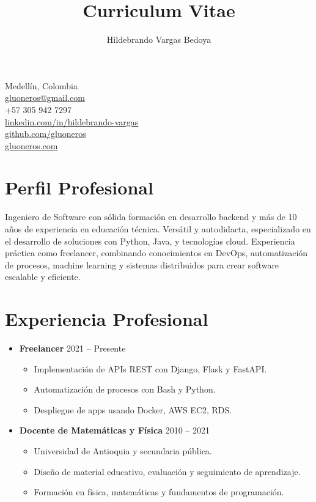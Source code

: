 \documentclass[a4paper,10pt]{article}
\begin{document}
	
	\title{\textbf{Curriculum Vitae}}
	\author{Hildebrando Vargas Bedoya}
	\date{}
	\maketitle
	
	\begin{center}
		Medellín, Colombia \\
		\href{mailto:gluoneros@gmail.com}{gluoneros@gmail.com} \\
		+57 305 942 7297 \\
		\href{https://linkedin.com/in/hildebrando-vargas}{linkedin.com/in/hildebrando-vargas} \\
		\href{https://github.com/gluoneros}{github.com/gluoneros} \\
		\href{https://gluoneros.com}{gluoneros.com}
	\end{center}
	
	\section*{Perfil Profesional}
	Ingeniero de Software con sólida formación en desarrollo backend y más de 10 años de experiencia en educación técnica. Versátil y autodidacta, especializado en el desarrollo de soluciones con Python, Java, y tecnologías cloud. Experiencia práctica como freelancer, combinando conocimientos en DevOps, automatización de procesos, machine learning y sistemas distribuidos para crear software escalable y eficiente.
	
	\section*{Experiencia Profesional}
	\begin{itemize}[leftmargin=*]
		\item \textbf{Freelancer} \hfill 2021 – Presente
		\begin{itemize}
			\item Implementación de APIs REST con Django, Flask y FastAPI.
			\item Automatización de procesos con Bash y Python.
			\item Despliegue de apps usando Docker, AWS EC2, RDS.
		\end{itemize}
		\item \textbf{Docente de Matemáticas y Física} \hfill 2010 – 2021
		\begin{itemize}
			\item Universidad de Antioquia y secundaria pública.
			\item Diseño de material educativo, evaluación y seguimiento de aprendizaje.
			\item Formación en física, matemáticas y fundamentos de programación.
		\end{itemize}
	\end{itemize}
	
\end{document}
